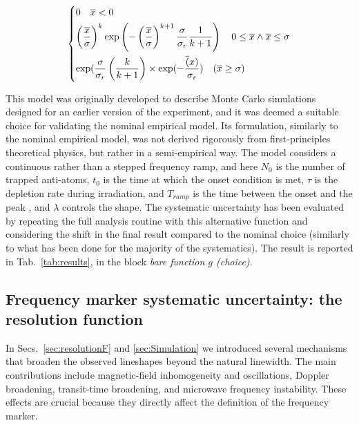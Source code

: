 \begin{equation}
\begin{dcases}
0 \quad \overline{x} < 0 \\
\left(\frac{\overline{x}}{\sigma}\right)^k \text{exp}\left( - \left(\frac{\overline{x}}{\sigma}\right)^{k+1} \frac{\sigma}{\sigma_r}  \frac{1}{k + 1}\right) \quad 0 \leq \overline{x} \land  \overline{x} \leq \sigma  \\
\text{exp}( \frac{\sigma}{\sigma_r} \left( \frac{k}{k+1}\right) \times \text{exp}(-\frac{\overline(x)}{\sigma_r}) \quad (\overline{x} \geq \sigma)
\end{dcases}
\end{equation}

 This model was originally developed to describe Monte Carlo simulations designed for an earlier version of the experiment, and it was deemed a suitable choice for validating the nominal empirical model. Its formulation, similarly to the nominal empirical model, was not derived rigorously from first-principles theoretical physics, but rather in a semi-empirical way.
The model considers a continuous rather than a stepped frequency ramp, and here $N_0$ is the number of trapped anti-atoms, $t_0$ is the time at which the onset condition is met, $\tau$ is the depletion rate during irradiation, and $T_{ramp}$ is the time between the onset and the peak , and $\lambda$ controls the shape. The systematic uncertainty has been evaluated by repeating the full analysis routine with this alternative function and considering the shift in the final result compared to the nominal choice (similarly to what has been done for the majority of the systematics). The result is reported in Tab.~\ref{tab:results}, in the block \textit{bare function $g$ (choice)}.

\subsection{Frequency marker systematic uncertainty: the resolution function}

In Secs.~\ref{sec:resolutionF} and \ref{sec:Simulation} we introduced several mechanisms that broaden the observed lineshapes beyond the natural linewidth. The main contributions include magnetic-field inhomogeneity and oscillations, Doppler broadening, transit-time broadening, and microwave frequency instability. These effects are crucial because they directly affect the definition of the frequency marker.
 
